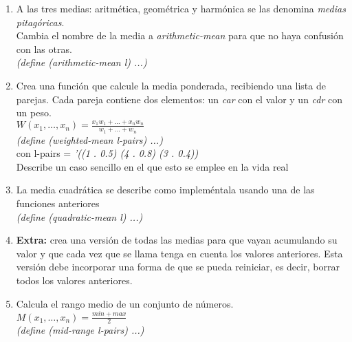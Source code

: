 \documentclass[11pt]{article}
\begin{document}
\begin{enumerate}
  \item A las tres medias: aritmética, geométrica y harmónica se las denomina \textit{medias pitagóricas}.
    \\[3mm]
    Cambia el nombre de la media a \textit{arithmetic-mean} para que no haya confusión con las otras.
    \\[3mm]
    \textit{(define (arithmetic-mean l) ...)}

  \item Crea una función que calcule la media ponderada, recibiendo una lista de parejas. Cada pareja contiene dos elementos: un \textit{car} con el valor y un \textit{cdr} con un peso.
    \\[3mm]
    {\Large
    $W(x_1,\dots,x_n) = \frac{x_1w_1 + \dots + x_nw_n}{w_1 + \dots + w_n}$
  }
    \\[3mm]
    \textit{(define (weighted-mean l-pairs) ...)}
    \\[3mm]
    con l-pairs = 
    \textit{'((1 . 0.5) (4 . 0.8) (3 . 0.4))}
    \\[3mm]
    Describe un caso sencillo en el que esto se emplee en la vida real

  \item La media cuadrática se describe como 
    impleméntala usando una de las funciones anteriores
    \\[3mm]
    \textit{(define (quadratic-mean l) ...)}

  \item \textbf{Extra:} crea una versión de todas las medias para que vayan acumulando su valor y que cada vez que se llama tenga en cuenta los valores anteriores. Esta versión debe incorporar una forma de que se pueda reiniciar, es decir, borrar todos los valores anteriores.

  \item Calcula el rango medio de un conjunto de números.
    \\[3mm]
    {\Large
    $M(x_1,\dots,x_n) = \frac{min + max}{2}$
  }
    \\[3mm]
    \textit{(define (mid-range l-pairs) ...)}
\end{enumerate}

\end{document}
